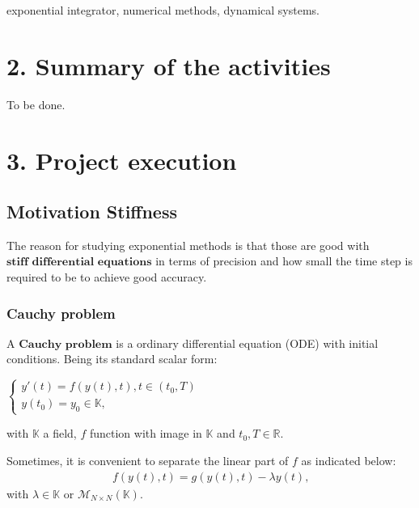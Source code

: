\documentclass[letterpaper,10pt,english]{jupyterBook}
\begin{document}
\sphinxAtStartPar
{} exponential integrator, numerical methods, dynamical systems.

\sphinxstepscope


\chapter{2. Summary of the activities}
\label{\detokenize{Summary_of_the_activities:summary-of-the-activities}}\label{\detokenize{Summary_of_the_activities::doc}}
\sphinxAtStartPar
To be done.

\sphinxstepscope


\chapter{3. Project execution}
\label{\detokenize{Project_execution:project-execution}}\label{\detokenize{Project_execution::doc}}
\sphinxstepscope

\sphinxstepscope


\section{Motivation \sphinxhyphen{} Stiffness}
\label{\detokenize{cap1:motivation-stiffness}}\label{\detokenize{cap1::doc}}
\sphinxAtStartPar
The reason for studying exponential methods is that those are good with \(\textbf{stiff differential equations}\) in terms of precision and how small the time step is required to be to achieve good accuracy.


\subsection{Cauchy problem}
\label{\detokenize{cap1:cauchy-problem}}
\sphinxAtStartPar
A \(\textbf{Cauchy problem}\) is a ordinary differential equation (ODE) with initial conditions. Being its standard scalar form:

\sphinxAtStartPar
\(\begin{cases}
    y'(t) = f(y(t), t), t \in (t_0, T) \\
    y(t_0) = y_0 \in \mathbb{K} \text{,}
\end{cases}\)

\sphinxAtStartPar
with \(\mathbb{K}\) a field, \(f\) function with image in \(\mathbb{K}\) and \(t_0, T \in \mathbb{R}\).

\sphinxAtStartPar
Sometimes, it is convenient to separate the linear part of \(f\) as indicated below:
\begin{equation*}
\begin{split}
    f(y(t), t) = g(y(t), t) - \lambda y(t) \text{,}
\end{split}
\end{equation*}
\sphinxAtStartPar
with \(\lambda \in \mathbb{K}\) or \(\mathscr{M}_{N \times N}(\mathbb{K})\).
\end{document}
